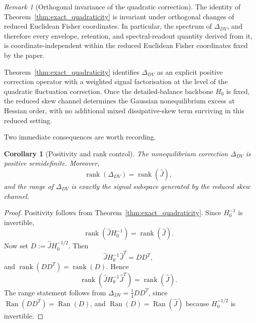 \documentclass[11pt,a4paper]{article}
\numberwithin{equation}{section}
\theoremstyle{thmcompact}
\newtheorem{corollary}[theorem]{Corollary}
\theoremstyle{remark}
\newtheorem*{remarkplain}{Remark}
\newenvironment{remark}[1][]%
{\begin{remarkbox}\begin{remarkplain}[#1]\normalfont}
		{\end{remarkplain}\end{remarkbox}}
\begin{document}
\begin{remark}[Orthogonal invariance of the quadratic correction]
The identity of Theorem~\ref{thm:exact_quadraticity} is invariant under orthogonal changes of reduced Euclidean Fisher coordinates. In particular, the spectrum of \(\Delta_{DV}\), and therefore every envelope, retention, and spectral-readout quantity derived from it, is coordinate-independent within the reduced Euclidean Fisher coordinates fixed by the paper.
\end{remark}

Theorem~\ref{thm:exact_quadraticity} identifies \(\Delta_{DV}\) as an explicit positive correction operator with a weighted signal factorisation at the level of the quadratic fluctuation correction. Once the detailed-balance backbone \(H_0\) is fixed, the reduced skew channel determines the Gaussian nonequilibrium excess at Hessian order, with no additional mixed dissipative-skew term surviving in this reduced setting.

Two immediate consequences are worth recording.

\begin{corollary}[Positivity and rank control]
\label{cor:positivity_rank_control}
The nonequilibrium correction \(\Delta_{DV}\) is positive semidefinite. Moreover,
\begin{equation}
\operatorname{rank}(\Delta_{DV})=\operatorname{rank}(\widehat J),
\end{equation}
and the range of \(\Delta_{DV}\) is exactly the signal subspace generated by the reduced skew channel.
\end{corollary}

\begin{proof}
Positivity follows from Theorem~\ref{thm:exact_quadraticity}. Since \(H_0^{-1}\) is invertible,
\begin{equation}
\operatorname{rank}(\widehat J H_0^{-1})=\operatorname{rank}(\widehat J).
\end{equation}
Now set \(D:=\widehat J H_0^{-1/2}\). Then
\begin{equation}
\widehat J H_0^{-1}\widehat J^T = DD^T,
\end{equation}
and \(\operatorname{rank}(DD^T)=\operatorname{rank}(D)\). Hence
\begin{equation}
\operatorname{rank}\!\left(\widehat J H_0^{-1}\widehat J^T\right)=\operatorname{rank}(\widehat J).
\end{equation}
The range statement follows from \(\Delta_{DV}=\tfrac14 DD^T\), since \(\operatorname{Ran}(DD^T)=\operatorname{Ran}(D)\), and \(\operatorname{Ran}(D)=\operatorname{Ran}(\widehat J)\) because \(H_0^{-1/2}\) is invertible.
\end{proof}
\end{document}

